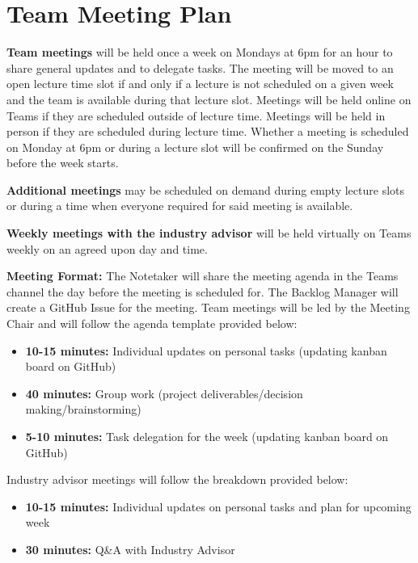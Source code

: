 \documentclass{article}
\begin{document}
\section{Team Meeting Plan}
\textbf{Team meetings} will be held once a week on Mondays at 6pm for an hour to share general updates and to delegate tasks. The meeting will be moved to an open lecture time slot if and only if a lecture is not scheduled on a given week and the team is available during that lecture slot. Meetings will be held online on Teams if they are scheduled outside of lecture time. Meetings will be held in person if they are scheduled during lecture time. Whether a meeting is scheduled on Monday at 6pm or during a lecture slot will be confirmed on the Sunday before the week starts.

\vspace{1em}

\noindent \textbf{Additional meetings} may be scheduled on demand during empty lecture slots or during a time when everyone required for said meeting is available.

\vspace{1em}

\noindent \textbf{Weekly meetings with the industry advisor} will be held virtually on Teams weekly on an agreed upon day and time. 

\vspace{1em}

\noindent \textbf{Meeting Format:}
The Notetaker will share the meeting agenda in the Teams channel the day before the meeting is scheduled for. The Backlog Manager will create a GitHub Issue for the meeting. Team meetings will be led by the Meeting Chair and will follow the agenda template provided below:
\begin{itemize}
  \item \textbf{10-15 minutes:} Individual updates on personal tasks (updating kanban board on GitHub)
  \item \textbf{40 minutes:} Group work (project deliverables/decision making/brainstorming)
  \item \textbf{5-10 minutes:} Task delegation for the week (updating kanban board on GitHub)
\end{itemize}

\noindent Industry advisor meetings will follow the breakdown provided below:
\begin{itemize}
  \item \textbf{10-15 minutes:} Individual updates on personal tasks and plan for upcoming week
  \item \textbf{30 minutes:} Q\&A with Industry Advisor
\end{itemize}
\end{document}

